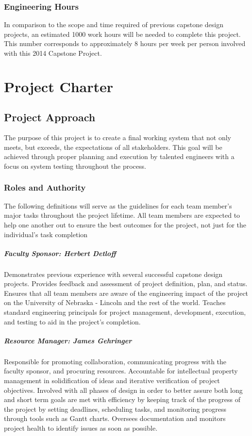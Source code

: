 \documentclass[11pt]{report}
\begin{document}
\subsection{Engineering Hours}
In comparison to the scope and time required of previous capstone design projects, an estimated 1000 work hours will be needed to complete this project.
This number corresponds to approximately 8 hours per week per person involved with this 2014 Capstone Project.

\chapter{Project Charter}
\section{Project Approach}
The purpose of this project is to create a final working system that not only meets, but exceeds, the expectations of all stakeholders. This goal will be achieved through proper planning and execution by talented engineers with a focus on system testing throughout the process.

\subsection{Roles and Authority}
The following definitions will serve as the guidelines for each team member's major tasks throughout the project lifetime. All team members are expected to help one another out to ensure the best outcomes for the project, not just for the individual's task completion
\paragraph{Faculty Sponsor: Herbert Detloff}
Demonstrates previous experience with several successful capstone design projects.
Provides feedback and assessment of project definition, plan, and status.
Ensures that all team members are aware of the engineering impact of the project on the University of Nebraska - Lincoln and the rest of the world.
Teaches standard engineering principals for project management, development, execution, and testing to aid in the project's completion.

\paragraph{Resource Manager: James Gehringer}
Responsible for promoting collaboration, communicating progress with the faculty sponsor, and procuring resources.
Accountable for intellectual property management in solidification of ideas and iterative verification of project objectives.
Involved with all phases of design in order to better assure both long and short term goals are met with efficiency by keeping track of the progress of the project by setting deadlines, scheduling tasks, and monitoring progress through tools such as Gantt charts.
Oversees documentation and monitors project health to identify issues as soon as possible.
\end{document}
